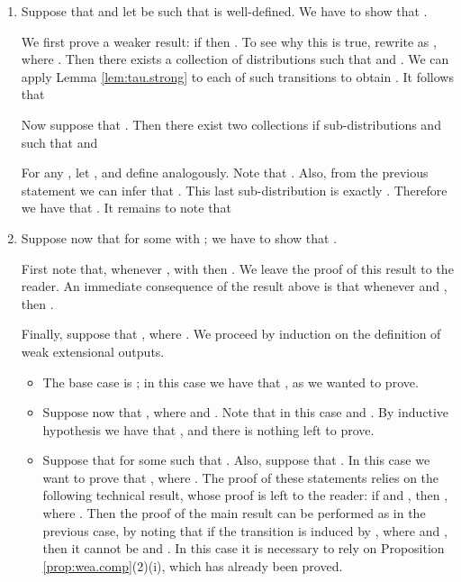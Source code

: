 \documentclass{LMCS}
\begin{document}
\begin{enumerate}
\item Suppose that  and let  be such that 
 is well-defined. We have to show that 
. 

We first prove a weaker result: 
if  then . 
To see why this is true, rewrite  as 
, where . 
Then there exists a collection of distributions  such that 
 and . 
We can apply Lemma \ref{lem:tau.strong} to each of such transitions to 
obtain 
. It follows that 


Now suppose that . Then there exist two collections 
if sub-distributions
 and  such that 
 and


For any , let , and define  analogously. 
Note that . 
Also, from the previous statement we can infer that 
. This last sub-distribution is exactly 
. Therefore we have that 
. It remains to note that 


\item Suppose now that  for some 
 with ; we have to show 
that 
. 

First note that, whenever , with 
 then . 
We leave the proof of this result to the reader. 
An immediate consequence of the result above is that whenever 
 and , then 
. 

Finally, suppose that , where . 
We proceed by induction on the definition of weak extensional outputs. 
\begin{itemize}
\item The base case is ; 
in this case we have that , as we wanted to prove. 
\item Suppose now that , where  and 
. Note that in this case  and 
. By inductive hypothesis we have that 
, 
and there is nothing left to prove.
\item Suppose that  for some  
such that . Also, suppose that . 
In this case we want to prove that 
, 
where . 
The proof of these statements relies on the following technical result, whose 
proof is left to the reader: if 
 and , then 
, 
where . 
Then the proof of the main result can be performed as in the previous case, 
by noting that if the transition  is induced by 
, 
where  and , then 
it cannot be  and . In this case it is necessary to rely 
on Proposition \ref{prop:wea.comp}(2)(i), which has already been proved.
\end{itemize}
\end{enumerate}






\end{document}
